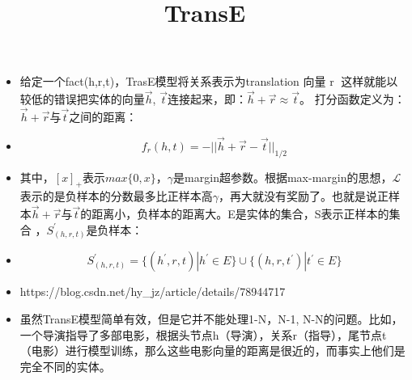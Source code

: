 \begin{frame}
	\title {TransE}
	\begin{itemize}
		\item  给定一个fact(h,r,t)，TrasE模型将关系表示为translation 向量 r⃗ ，这样就能以较低的错误把实体的向量$\vec{h}$, $\vec{t}$连接起来，即：$\vec{h} + \vec{r} \approx \vec{t}$。 打分函数定义为：$\vec{h} + \vec{r}与\vec{t}$之间的距离：
		\item 
		\begin{equation}
			f_r(h,t) = -||\vec{h} + \vec{r} - \vec{t}||_{1/2}
		\end{equation}
		\item 其中，$[x]_+$表示$max\{0,x\}$，$\gamma$是margin超参数。根据max-margin的思想，$\mathcal{L}$表示的是负样本的分数最多比正样本高$\gamma$，再大就没有奖励了。也就是说正样本$\vec{h}+\vec{r}$与$\vec{t}$的距离小，负样本的距离大。E是实体的集合，S表示正样本的集合 ，$S^{'}_{(h,r,t)}$是负样本： 	
		\item
			\begin{equation}
			S^{'}_{(h,r,t)}=\{(h^{'},r,t)| h^{'} \in E\} \cup \{ (h,r,t^{'})| t^{'} \in E\}
			\end{equation}
		
	\end{itemize}

\end{frame}

\begin{frame}
	\begin{itemize}
		\item https://blog.csdn.net/hy\_jz/article/details/78944717
		\item 虽然TransE模型简单有效，但是它并不能处理1-N，N-1, N-N的问题。比如，一个导演指导了多部电影，根据头节点h（导演），关系r（指导），尾节点t（电影）进行模型训练，那么这些电影向量的距离是很近的，而事实上他们是完全不同的实体。 
	\end{itemize}
\end{frame}

